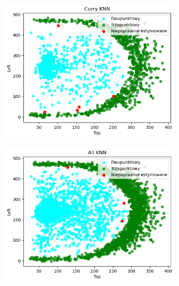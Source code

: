 \documentclass{beamer}
\begin{document}
\begin{frame}
\begin{figure}
		\begin{subfigure}[b]{0.45\textwidth}
			\includegraphics[width=\linewidth, height=0.45\textheight]{E_KNN1_scatter.png}
		\end{subfigure}
		\begin{subfigure}[b]{0.45\textwidth}
			\includegraphics[width=\linewidth, height=0.45\textheight]{E_KNN_all_scatter.png}
		\end{subfigure}
	\end{figure}
\end{frame}
\end{document}
